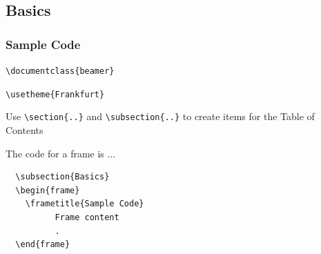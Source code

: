 \documentclass{beamer}
\begin{document}
\subsection{Basics}
\begin{frame}[fragile]
  \frametitle{Sample Code}
\verb+\documentclass{beamer}+
  
\verb+\usetheme{Frankfurt}+

  Use \verb+\section{..}+  and \verb+\subsection{..}+ to
create items for the Table of Contents

\alert<1>{The code for a frame is ...}
\begin{verbatim}
  \subsection{Basics}
  \begin{frame}
    \frametitle{Sample Code}
          Frame content
          .
  \end{frame}
\end{verbatim}
\end{frame}
%
\end{document}
